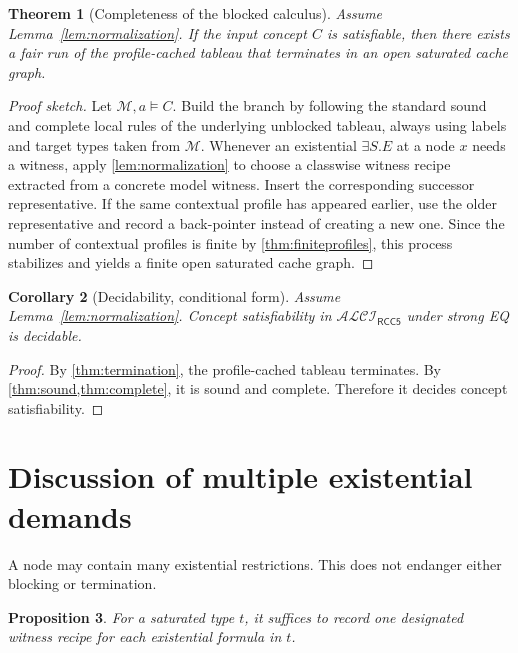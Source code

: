 \documentclass[11pt]{article}
\newtheorem{theorem}{Theorem}[section]
\newtheorem{proposition}[theorem]{Proposition}
\newtheorem{corollary}[theorem]{Corollary}
\theoremstyle{definition}
\newcommand{\ALCIRCCFive}{\mathcal{ALCI}_{\mathsf{RCC5}}}
\begin{document}
\begin{theorem}[Completeness of the blocked calculus]\label{thm:complete}
Assume Lemma~\ref{lem:normalization}. If the input concept $C$ is satisfiable, then there exists a fair run of the profile-cached tableau that terminates in an open saturated cache graph.
\end{theorem}

\begin{proof}[Proof sketch]
Let $\mathcal M,a\models C$. Build the branch by following the standard sound and complete local rules of the underlying unblocked tableau, always using labels and target types taken from $\mathcal M$. Whenever an existential $\exists S.E$ at a node $x$ needs a witness, apply \cref{lem:normalization} to choose a classwise witness recipe extracted from a concrete model witness. Insert the corresponding successor representative. If the same contextual profile has appeared earlier, use the older representative and record a back-pointer instead of creating a new one. Since the number of contextual profiles is finite by \cref{thm:finiteprofiles}, this process stabilizes and yields a finite open saturated cache graph.
\end{proof}

\begin{corollary}[Decidability, conditional form]\label{cor:decidability}
Assume Lemma~\ref{lem:normalization}. Concept satisfiability in $\ALCIRCCFive$ under strong EQ is decidable.
\end{corollary}

\begin{proof}
By \cref{thm:termination}, the profile-cached tableau terminates. By \cref{thm:sound,thm:complete}, it is sound and complete. Therefore it decides concept satisfiability.
\end{proof}

\section{Discussion of multiple existential demands}

A node may contain many existential restrictions. This does not endanger either blocking or termination.

\begin{proposition}\label{prop:multipleexists}
For a saturated type $t$, it suffices to record one designated witness recipe for each existential formula in $t$.
\end{proposition}
\end{document}
